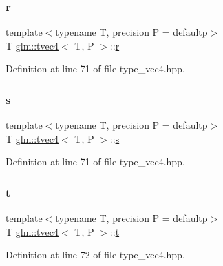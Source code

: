 \subsubsection{\texorpdfstring{r}{r}}
{\footnotesize\ttfamily template$<$typename T, precision P = defaultp$>$ \\
T \mbox{\hyperlink{structglm_1_1tvec4}{glm\+::tvec4}}$<$ T, P $>$\+::\mbox{\hyperlink{glad_8h_abe08814c2f72843fde4d8df41440d5a0}{r}}}



Definition at line 71 of file type\+\_\+vec4.\+hpp.

\mbox{\label{structglm_1_1tvec4_a8d6d8de5a61b16e045bd1e8a85feeb67}} 
\subsubsection{\texorpdfstring{s}{s}}
{\footnotesize\ttfamily template$<$typename T, precision P = defaultp$>$ \\
T \mbox{\hyperlink{structglm_1_1tvec4}{glm\+::tvec4}}$<$ T, P $>$\+::\mbox{\hyperlink{glad_8h_af1b1d5edfea6a34daee7389b1b5810ad}{s}}}



Definition at line 71 of file type\+\_\+vec4.\+hpp.

\mbox{\label{structglm_1_1tvec4_ac0ff5b73b4b17e668bf87803b50861c9}} 
\subsubsection{\texorpdfstring{t}{t}}
{\footnotesize\ttfamily template$<$typename T, precision P = defaultp$>$ \\
T \mbox{\hyperlink{structglm_1_1tvec4}{glm\+::tvec4}}$<$ T, P $>$\+::\mbox{\hyperlink{glad_8h_aef9f00bf06d58b8db7e501e287488401}{t}}}



Definition at line 72 of file type\+\_\+vec4.\+hpp.

\mbox{\label{structglm_1_1tvec4_a2a6f7d33e64cf0b38ec82403be5073e4}} 
